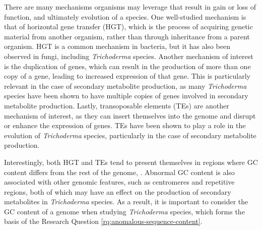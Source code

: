 There are many mechanisms organisms may leverage that result in gain or loss of function, and ultimately evolution of a species. One well-studied mechanism is that of horizontal gene transfer (HGT), which is the process of acquiring genetic material from another organism, rather than through inheritance from a parent organism\cite{Goncalves2024}. HGT is a common mechanism in bacteria, but it has also been observed in fungi, including \textit{Trichoderma} species\cite{Goncalves2024}. Another mechanism of interest is the duplication of genes, which can result in the production of more than one copy of a gene, leading to increased expression of that gene\cite{Goncalves2024}. This is particularly relevant in the case of secondary metabolite production, as many \textit{Trichoderma} species have been shown to have multiple copies of genes involved in secondary metabolite production\cite{Mukherjee2012}. Lastly, transoposable elements (TEs) are another mechanism of interest, as they can insert themselves into the genome and disrupt or enhance the expression of genes\cite{Goncalves2024}. TEs have been shown to play a role in the evolution of \textit{Trichoderma} species, particularly in the case of secondary metabolite production\cite{Goncalves2024}. 

Interestingly, both HGT and TEs tend to present themselves in regions where GC content differs from the rest of the genome, \cite{Goncalves2024}. Abnormal GC content is also associated with other genomic features, such as centromeres\cite{Plohl2014} and repetitive regions\cite{10.1371/journal.pgen.1007467}, both of which may have an effect on the production of secondary metabolites in \textit{Trichoderma} species. As a result, it is important to consider the GC content of a genome when studying \textit{Trichoderma} species, which forms the basis of the Research Question \ref{rq:anomalous-sequence-content}.

